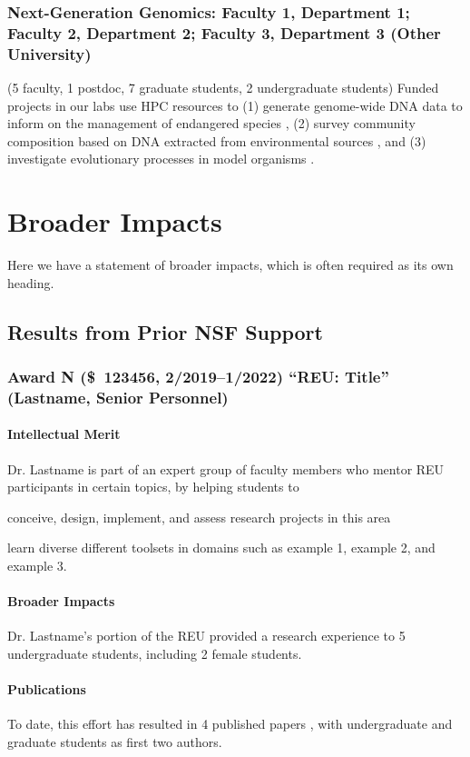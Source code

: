 \documentclass[10pt]{nsf-proposal}
\newcommand{\dol}[2][]{\SI{#2}[\$]{#1}}
\begin{document}
\subsubsection{Next-Generation Genomics: Faculty 1, Department 1; Faculty 2, Department 2; Faculty 3, Department 3 (Other University)}

(5 faculty, 1 postdoc, 7 graduate students, 2 undergraduate students)
Funded projects in our labs use HPC resources to (1) generate genome-wide DNA data to inform on the management of endangered species \cite{torkamaneh2016}, (2) survey community composition based on DNA extracted from environmental sources \cite{watts2019}, and (3) investigate evolutionary processes in model organisms \cite{hurt2021}.

\section*{Broader Impacts}

Here we have a statement of broader impacts, which is often required as its own heading.

\subsection{Results from Prior NSF Support}

\subsubsection{Award N (\dol{123456}, 2/2019--1/2022) ``REU: Title'' (Lastname, Senior Personnel)}

\paragraph{Intellectual Merit}

Dr. Lastname is part of an expert group of faculty members who mentor REU participants in certain topics, by helping students to
\begin{enumerate*}[label=(\arabic*), itemjoin={{; }}, itemjoin*={{; and }}]
\item conceive, design, implement, and assess research projects in this area
\item learn diverse different toolsets in domains such as example 1, example 2, and example 3.
\end{enumerate*}

\paragraph{Broader Impacts}
Dr. Lastname's portion of the REU provided a research experience to 5 undergraduate students, including 2 female students.

\paragraph{Publications}
To date, this effort has resulted in 4 published papers \cite{paudel2019a,paudel2019b,paudel2018,mookiah2017}, with undergraduate and graduate students as first two authors.

\renewcommand{\bibname}{References Cited}
\printbibliography[heading=bibnumbered]
\end{document}
